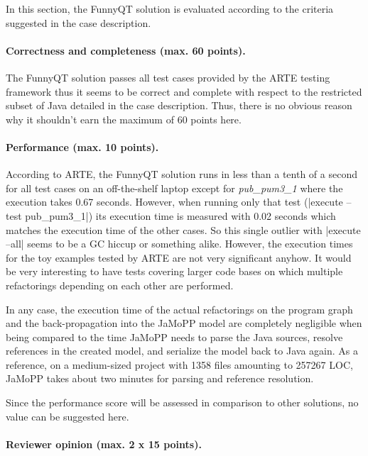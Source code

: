 \documentclass[submission]{eptcs}
\newcommand{\code}{\clojureinline}
\begin{document}
In this section, the FunnyQT solution is evaluated according to the criteria
suggested in the case description.


\paragraph{Correctness and completeness (max. 60 points).}

The FunnyQT solution passes all test cases provided by the ARTE testing
framework thus it seems to be correct and complete with respect to the
restricted subset of Java detailed in the case description.  Thus, there is no
obvious reason why it shouldn't earn the maximum of 60 points here.


\paragraph{Performance (max. 10 points).}

According to ARTE, the FunnyQT solution runs in less than a tenth of a second
for all test cases on an off-the-shelf laptop except for \textit{pub\_pum3\_1}
where the execution takes 0.67 seconds.  However, when running only that test
(\code|execute --test pub_pum3_1|) its execution time is measured with 0.02
seconds which matches the execution time of the other cases.  So this single
outlier with \code|execute --all| seems to be a GC hiccup or something alike.
However, the execution times for the toy examples tested by ARTE are not very
significant anyhow.  It would be very interesting to have tests covering larger
code bases on which multiple refactorings depending on each other are
performed.

In any case, the execution time of the actual refactorings on the program graph
and the back-propagation into the JaMoPP model are completely negligible when
being compared to the time JaMoPP needs to parse the Java sources, resolve
references in the created model, and serialize the model back to Java again.
As a reference, on a medium-sized project with 1358 files amounting to 257267
LOC, JaMoPP takes about two minutes for parsing and reference resolution.

Since the performance score will be assessed in comparison to other solutions,
no value can be suggested here.


\paragraph{Reviewer opinion (max. 2 x 15 points).}
\end{document}
